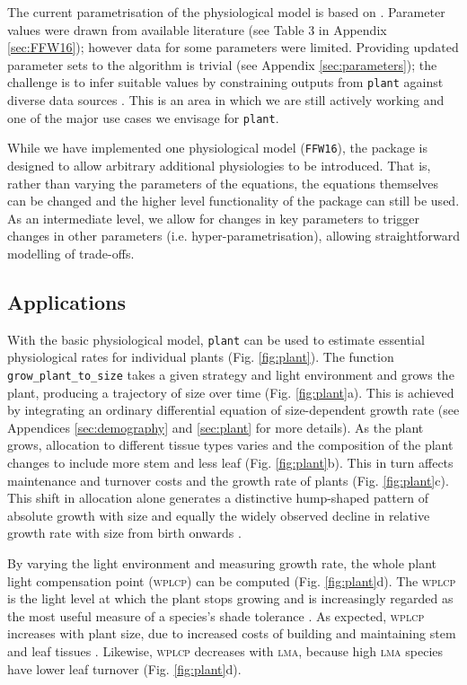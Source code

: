 \documentclass[a4paper,11pt]{article}
\newcommand{\plant}{\texttt{plant}}
\begin{document}
The current parametrisation of the physiological model is based on
\citet{Falster-2011}. Parameter values were drawn from available
literature (see Table 3 in Appendix \ref{sec:FFW16}); however data for
some parameters were limited. Providing updated parameter sets to the
algorithm is
trivial (see Appendix \ref{sec:parameters}); the challenge is to infer
suitable values by constraining outputs from {\plant} against diverse
data sources \citep{Lebauer-2012, Keenan-2013}. This is an area in
which we are still actively working and one of the major use cases we
envisage for {\plant}.

While we have implemented one physiological model (\texttt{FFW16}),
the package is designed to allow arbitrary additional physiologies to
be introduced.  That is, rather than varying the parameters of the
equations, the equations themselves can be changed and the higher
level functionality of the package can still be used.  As an
intermediate level, we allow for changes in key parameters to trigger
changes in other parameters (i.e. hyper-parametrisation), allowing
straightforward modelling of trade-offs.

\subsection{Applications}

With the basic physiological model, {\plant} can be used to estimate
essential physiological rates for individual plants
(Fig. \ref{fig:plant}). The function \texttt{grow\_plant\_to\_size}
takes a given strategy and light environment and grows the plant,
producing a trajectory of size over time (Fig. \ref{fig:plant}a). This
is achieved by integrating an ordinary differential equation of
size-dependent growth rate (see Appendices \ref{sec:demography} and
\ref{sec:plant} for more details). As the plant grows, allocation to
different tissue types varies and the composition of the plant
changes to include more stem and less leaf
(Fig. \ref{fig:plant}b). This in turn affects maintenance and turnover
costs and the growth rate of plants (Fig. \ref{fig:plant}c).  This
shift in allocation alone generates a distinctive hump-shaped pattern
of absolute growth with size \citep{King-2011} and equally the widely
observed decline in relative growth rate with size from birth onwards
\citep{Enquist-2007}.

By varying the light environment and measuring growth rate, the whole
plant light compensation point (\textsc{wplcp}) can be computed (Fig.
\ref{fig:plant}d). The \textsc{wplcp} is the light level at which the plant 
stops growing and is increasingly regarded as the most useful
measure of a species's shade tolerance
\citep{Givnish-1988, Baltzer-2007, Lusk-2013}. As expected, \textsc{wplcp}
increases with plant size, due to increased costs of building and
maintaining stem and leaf tissues \citep{Givnish-1988}. Likewise, \textsc{wplcp}
decreases with \textsc{lma}, because high \textsc{lma} species have lower leaf turnover
\citep{Baltzer-2007, Lusk-2013} (Fig.
\ref{fig:plant}d).
\end{document}
